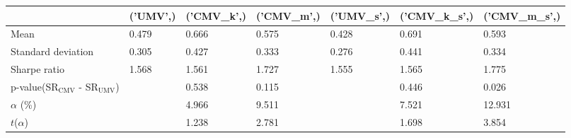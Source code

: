 \begin{tabular}{lllllll}
\toprule
 & ('UMV',) & ('CMV_k',) & ('CMV_m',) & ('UMV_s',) & ('CMV_k_s',) & ('CMV_m_s',) \\
\midrule
Mean & 0.479 & 0.666 & 0.575 & 0.428 & 0.691 & 0.593 \\
Standard deviation & 0.305 & 0.427 & 0.333 & 0.276 & 0.441 & 0.334 \\
Sharpe ratio & 1.568 & 1.561 & 1.727 & 1.555 & 1.565 & 1.775 \\
p-value(SR$_{\text{CMV}}$ - SR$_{\text{UMV}}$) &  & 0.538 & 0.115 &  & 0.446 & 0.026 \\
$\alpha$ (\%) &  & 4.966 & 9.511 &  & 7.521 & 12.931 \\
$t$($\alpha$) &  & 1.238 & 2.781 &  & 1.698 & 3.854 \\
\bottomrule
\end{tabular}
